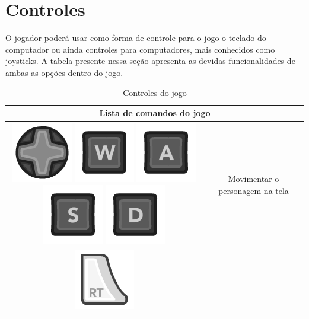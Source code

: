 \documentclass{article}
\begin{document}
\section{Controles}
O jogador poderá usar como forma de controle para o jogo o teclado do computador ou ainda controles para computadores, mais conhecidos como joysticks. A tabela presente nessa seção apresenta as devidas funcionalidades de ambas as opções dentro do jogo.

\begin{longtable}{|c|c|}
\caption{Controles do jogo}
\\
\hline
\multicolumn{2}{|c|}{Lista de comandos do jogo}
\\
\hline
\includegraphics[scale=0.3]{images/360_Dpad.png}
\includegraphics[scale=0.3]{images/kW.png} 
\includegraphics[scale=0.3]{images/kA.png}
\includegraphics[scale=0.3]{images/kS.png}
\includegraphics[scale=0.3]{images/kD.png}
& Movimentar o personagem na tela
\\
\hline
\includegraphics[scale=0.3]{images/360_RT.png}

\end{longtable}
\end{document}
